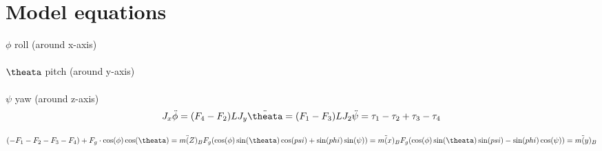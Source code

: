\section{Model equations}
$\phi$ roll (around x-axis)\\ \\
$\theata$ pitch (around y-axis)\\ \\
$\psi$ yaw (around z-axis)\\

\begin{equation}
J_x\ddot{\phi}=(F_4-F_2)L\\
J_y \ddot{\theata}=(F_1-F_3)L\\
J_2\ddot{\psi}=\tau_1-\tau_2+\tau_3-\tau_4
\end{equation}

\begin{equation}
(-F_1-F_2-F_3-F_4)+F_g\cdot \cos(\phi)\cos(\theata)=m\ddot(Z)_B\\
F_g(\cos(\phi)\sin(\theata)\cos(psi)+\sin(phi)\sin(\psi))=m\ddot(x)_B\\
F_g(\cos(\phi)\sin(\theata)\sin(psi)-\sin(phi)\cos(\psi))=m\ddot(y)_B\\
\end{equation}
